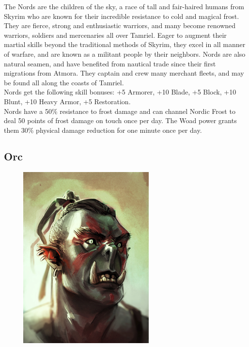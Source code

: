 \documentclass[12pt]{book}
\begin{document}
The Nords are the children of the sky, a race of tall and fair-haired humans from Skyrim who are known for their incredible resistance to cold and magical frost. They are fierce, strong and enthusiastic warriors, and many become renowned warriors, soldiers and mercenaries all over Tamriel. Eager to augment their martial skills beyond the traditional methods of Skyrim, they excel in all manner of warfare, and are known as a militant people by their neighbors. Nords are also natural seamen, and have benefited from nautical trade since their first migrations from Atmora. They captain and crew many merchant fleets, and may be found all along the coasts of Tamriel.\\

Nords get the following skill bonuses: +5 Armorer, +10 Blade, +5 Block, +10 Blunt, +10 Heavy Armor, +5 Restoration.\\

Nords have a 50\% resistance to frost damage and can channel Nordic Frost to deal 50 points of frost damage on touch once per day. The Woad power grants them 30\% physical damage reduction for one minute once per day.

\subsection{Orc}
\begin{figure}
	\includegraphics[width=\textwidth]{Orc.png}
\end{figure}
\end{document}

